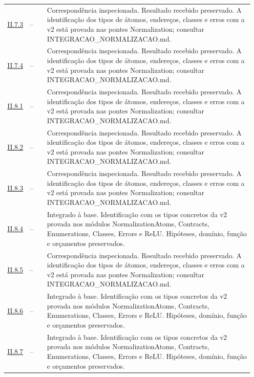 \documentclass[12pt,a4paper]{article}
\theoremstyle{preciso}
\theoremstyle{definition}
\theoremstyle{preciso}
\theoremstyle{preciso}
\theoremstyle{preciso}
\theoremstyle{preciso}
\theoremstyle{definition}
\theoremstyle{preciso}
\theoremstyle{definition}
\theoremstyle{preciso}
\theoremstyle{preciso}
\theoremstyle{definition}
\begin{document}
\begin{singlespace}
\begin{longtable}{@{}p{.11\linewidth}p{.09\linewidth}p{.09\linewidth}p{.59\linewidth}@{}}
\hyperref[map:normalizacao:7.3]{II.7.3} & -- & \pageref{map:normalizacao:7.3} & Correspondência inspecionada. Resultado recebido preservado. A identificação dos tipos de átomos, endereços, classes e erros com a v2 está provada nas pontes Normalization; consultar INTEGRACAO\_NORMALIZACAO.md.\\[4pt]
\hyperref[map:normalizacao:7.4]{II.7.4} & -- & \pageref{map:normalizacao:7.4} & Correspondência inspecionada. Resultado recebido preservado. A identificação dos tipos de átomos, endereços, classes e erros com a v2 está provada nas pontes Normalization; consultar INTEGRACAO\_NORMALIZACAO.md.\\[4pt]
\hyperref[map:normalizacao:8.1]{II.8.1} & -- & \pageref{map:normalizacao:8.1} & Correspondência inspecionada. Resultado recebido preservado. A identificação dos tipos de átomos, endereços, classes e erros com a v2 está provada nas pontes Normalization; consultar INTEGRACAO\_NORMALIZACAO.md.\\[4pt]
\hyperref[map:normalizacao:8.2]{II.8.2} & -- & \pageref{map:normalizacao:8.2} & Correspondência inspecionada. Resultado recebido preservado. A identificação dos tipos de átomos, endereços, classes e erros com a v2 está provada nas pontes Normalization; consultar INTEGRACAO\_NORMALIZACAO.md.\\[4pt]
\hyperref[map:normalizacao:8.3]{II.8.3} & -- & \pageref{map:normalizacao:8.3} & Correspondência inspecionada. Resultado recebido preservado. A identificação dos tipos de átomos, endereços, classes e erros com a v2 está provada nas pontes Normalization; consultar INTEGRACAO\_NORMALIZACAO.md.\\[4pt]
\hyperref[map:normalizacao:8.4]{II.8.4} & -- & \pageref{map:normalizacao:8.4} & Integrado à base. Identificação com os tipos concretos da v2 provada nos módulos NormalizationAtoms, Contracts, Enumerations, Classes, Errors e ReLU. Hipóteses, domínio, função e orçamentos preservados.\\[4pt]
\hyperref[map:normalizacao:8.5]{II.8.5} & -- & \pageref{map:normalizacao:8.5} & Correspondência inspecionada. Resultado recebido preservado. A identificação dos tipos de átomos, endereços, classes e erros com a v2 está provada nas pontes Normalization; consultar INTEGRACAO\_NORMALIZACAO.md.\\[4pt]
\hyperref[map:normalizacao:8.6]{II.8.6} & -- & \pageref{map:normalizacao:8.6} & Integrado à base. Identificação com os tipos concretos da v2 provada nos módulos NormalizationAtoms, Contracts, Enumerations, Classes, Errors e ReLU. Hipóteses, domínio, função e orçamentos preservados.\\[4pt]
\hyperref[map:normalizacao:8.7]{II.8.7} & -- & \pageref{map:normalizacao:8.7} & Integrado à base. Identificação com os tipos concretos da v2 provada nos módulos NormalizationAtoms, Contracts, Enumerations, Classes, Errors e ReLU. Hipóteses, domínio, função e orçamentos preservados.\\[4pt]
\bottomrule\end{longtable}\normalsize


\end{singlespace}
\end{document}
